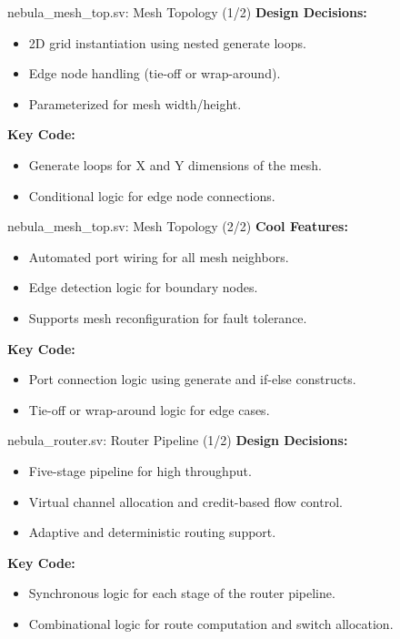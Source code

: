 \documentclass{beamer}
\begin{document}
\begin{frame}{nebula\_mesh\_top.sv: Mesh Topology (1/2)}
  \textbf{Design Decisions:}
  \begin{itemize}
    \item 2D grid instantiation using nested generate loops.
    \item Edge node handling (tie-off or wrap-around).
    \item Parameterized for mesh width/height.
  \end{itemize}
  \textbf{Key Code:}
  \begin{itemize}
    \item Generate loops for X and Y dimensions of the mesh.
    \item Conditional logic for edge node connections.
  \end{itemize}
\end{frame}

\begin{frame}{nebula\_mesh\_top.sv: Mesh Topology (2/2)}
  \textbf{Cool Features:}
  \begin{itemize}
    \item Automated port wiring for all mesh neighbors.
    \item Edge detection logic for boundary nodes.
    \item Supports mesh reconfiguration for fault tolerance.
  \end{itemize}
  \textbf{Key Code:}
  \begin{itemize}
    \item Port connection logic using generate and if-else constructs.
    \item Tie-off or wrap-around logic for edge cases.
  \end{itemize}
\end{frame}

\begin{frame}{nebula\_router.sv: Router Pipeline (1/2)}
  \textbf{Design Decisions:}
  \begin{itemize}
    \item Five-stage pipeline for high throughput.
    \item Virtual channel allocation and credit-based flow control.
    \item Adaptive and deterministic routing support.
  \end{itemize}
  \textbf{Key Code:}
  \begin{itemize}
    \item Synchronous logic for each stage of the router pipeline.
    \item Combinational logic for route computation and switch allocation.
  \end{itemize}
\end{frame}
\end{document}
